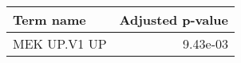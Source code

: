 \begin{tabular}{lr}
\toprule
   Term name &  Adjusted p-value \\
\midrule
MEK UP.V1 UP &          9.43e-03 \\
\bottomrule
\end{tabular}
